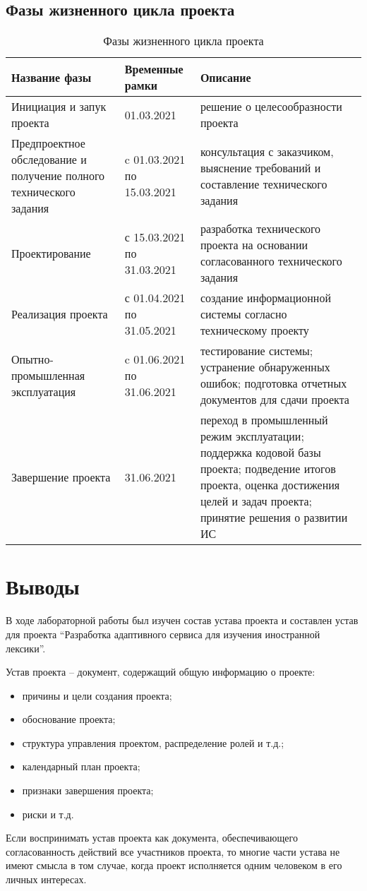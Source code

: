 \documentclass[a4paper,14pt]{extarticle}
\begin{document}
\subsection{Фазы жизненного цикла проекта}
\begin{table}[H]
    \caption{Фазы жизненного цикла проекта}
    \begin{tabular}{ | p{5cm} | p{3cm} | p{8cm} | }
        \hline
        Название фазы & Временные рамки & Описание \\ \hline
        Инициация и запук проекта & 01.03.2021 & решение о целесообразности проекта \\ \hline
        Предпроектное обследование и получение полного технического задания & c 01.03.2021 по 15.03.2021 & консультация с заказчиком, выяснение требований и составление технического задания \\ \hline
        Проектирование & с 15.03.2021 по 31.03.2021 & разработка технического проекта на основании согласованного технического задания \\ \hline
        Реализация проекта & с 01.04.2021 по 31.05.2021 & создание информационной системы согласно техническому проекту \\ \hline
        Опытно-промышленная эксплуатация & c 01.06.2021 по 31.06.2021 & тестирование системы; устранение обнаруженных ошибок; подготовка отчетных документов для сдачи проекта \\ \hline
        Завершение проекта & 31.06.2021 & переход в промышленный режим эксплуатации; поддержка кодовой базы проекта; подведение итогов проекта, оценка достижения целей и задач проекта; принятие решения о развитии ИС \\ \hline
    \end{tabular}
\end{table}

\section*{Выводы}
В ходе лабораторной работы был изучен состав устава проекта и составлен устав
для проекта \enquote{Разработка адаптивного сервиса для изучения иностранной
лексики}.

Устав проекта -- документ, содержащий общую информацию о проекте:
\begin{itemize}
    \item причины и цели создания проекта;
    \item обоснование проекта;
    \item структура управления проектом, распределение ролей и т.д.;
    \item календарный план проекта;
    \item признаки завершения проекта;
    \item риски и т.д.
\end{itemize}

Если воспринимать устав проекта как документа, обеспечивающего согласованность
действий все участников проекта, то многие части устава не имеют смысла в том
случае, когда проект исполняется одним человеком в его личных интересах.
\end{document}
